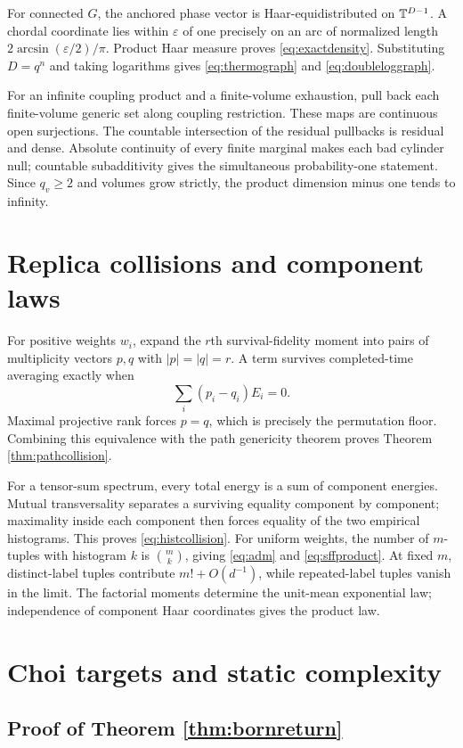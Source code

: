 For connected $G$, the anchored phase vector is Haar-equidistributed on
$\mathbb T^{D-1}$.  A chordal coordinate lies within $\varepsilon$ of one precisely
on an arc of normalized length
$2\arcsin(\varepsilon/2)/\pi$.  Product Haar measure proves
\eqref{eq:exactdensity}.  Substituting $D=q^n$ and taking logarithms gives
\eqref{eq:thermograph} and \eqref{eq:doubleloggraph}.

For an infinite coupling product and a finite-volume exhaustion, pull
back each finite-volume generic set along coupling restriction.  These
maps are continuous open surjections.  The countable intersection of the
residual pullbacks is residual and dense.  Absolute continuity of every
finite marginal makes each bad cylinder null; countable subadditivity gives
the simultaneous probability-one statement.  Since $q_v\ge2$ and volumes
grow strictly, the product dimension minus one tends to infinity.

\section{Replica collisions and component laws}

For positive weights $w_i$, expand the $r$th survival-fidelity moment into
pairs of multiplicity vectors $p,q$ with $|p|=|q|=r$.  A term survives
completed-time averaging exactly when
\[
 \sum_i(p_i-q_i)E_i=0.
\]
Maximal projective rank forces $p=q$, which is precisely the permutation
floor.  Combining this equivalence with the path genericity theorem proves
Theorem \ref{thm:pathcollision}.

For a tensor-sum spectrum, every total energy is a sum of component energies.
Mutual transversality separates a surviving equality component by component;
maximality inside each component then forces equality of the two empirical
histograms.  This proves \eqref{eq:histcollision}.  For uniform weights, the
number of $m$-tuples with histogram $k$ is $\binom{m}{k}$, giving
\eqref{eq:adm} and \eqref{eq:sffproduct}.  At fixed $m$, distinct-label
tuples contribute $m!+O(d^{-1})$, while repeated-label tuples vanish in the
limit.  The factorial moments determine the unit-mean exponential law;
independence of component Haar coordinates gives the product law.

\section{Choi targets and static complexity}

\subsection{Proof of Theorem \ref{thm:bornreturn}}

